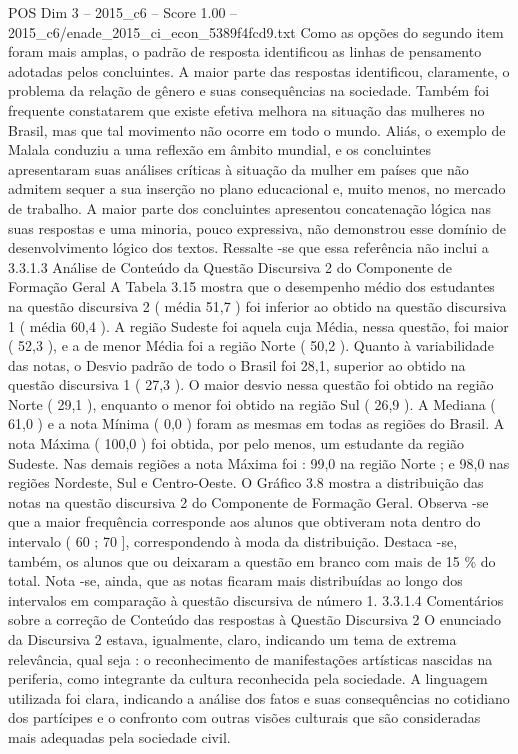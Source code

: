 \begin{textsample}{POS Dim 3 – 2015\_c6 – Score 1.00 – 2015\_c6/enade\_2015\_ci\_econ\_5389f4fcd9.txt}
Como as opções do segundo item foram mais amplas, o padrão de resposta identificou as linhas de pensamento adotadas pelos concluintes.
A maior parte das respostas identificou, claramente, o problema da relação de gênero e suas consequências na sociedade.
Também foi frequente constatarem que existe efetiva melhora na situação das mulheres no Brasil, mas que tal movimento não ocorre em todo o mundo.
Aliás, o exemplo de Malala conduziu a uma reflexão em âmbito mundial, e os concluintes apresentaram suas análises críticas à situação da mulher em países que não admitem sequer a sua inserção no plano educacional e, muito menos, no mercado de trabalho.
A maior parte dos concluintes apresentou concatenação lógica nas suas respostas e uma minoria, pouco expressiva, não demonstrou esse domínio de desenvolvimento lógico dos textos.
Ressalte -se que essa referência não inclui a 3.3.1.3 Análise de Conteúdo da Questão Discursiva 2 do Componente de Formação Geral A Tabela 3.15 mostra que o desempenho médio dos estudantes na questão discursiva 2 ( média 51,7 ) foi inferior ao obtido na questão discursiva 1 ( média 60,4 ).
A região Sudeste foi aquela cuja Média, nessa questão, foi maior ( 52,3 ), e a de menor Média foi a região Norte ( 50,2 ).
Quanto à variabilidade das notas, o Desvio padrão de todo o Brasil foi 28,1, superior ao obtido na questão discursiva 1 ( 27,3 ).
O maior desvio nessa questão foi obtido na região Norte ( 29,1 ), enquanto o menor foi obtido na região Sul ( 26,9 ).
A Mediana ( 61,0 ) e a nota Mínima ( 0,0 ) foram as mesmas em todas as regiões do Brasil.
A nota Máxima ( 100,0 ) foi obtida, por pelo menos, um estudante da região Sudeste.
Nas demais regiões a nota Máxima foi : 99,0 na região Norte ; e 98,0 nas regiões Nordeste, Sul e Centro-Oeste.
O Gráfico 3.8 mostra a distribuição das notas na questão discursiva 2 do Componente de Formação Geral.
Observa -se que a maior frequência corresponde aos alunos que obtiveram nota dentro do intervalo ( 60 ; 70 ], correspondendo à moda da distribuição.
Destaca -se, também, os alunos que ou deixaram a questão em branco com mais de 15 \% do total.
Nota -se, ainda, que as notas ficaram mais distribuídas ao longo dos intervalos em comparação à questão discursiva de número 1. 3.3.1.4 Comentários sobre a correção de Conteúdo das respostas à Questão Discursiva 2 O enunciado da Discursiva 2 estava, igualmente, claro, indicando um tema de extrema relevância, qual seja : o reconhecimento de manifestações artísticas nascidas na periferia, como integrante da cultura reconhecida pela sociedade.
A linguagem utilizada foi clara, indicando a análise dos fatos e suas consequências no cotidiano dos partícipes e o confronto com outras visões culturais que são consideradas mais adequadas pela sociedade civil.

\end{textsample}
